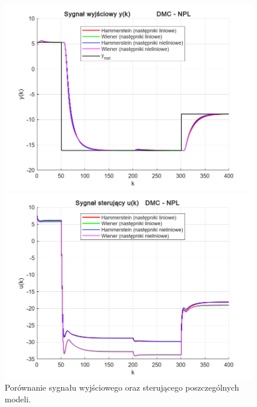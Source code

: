 \documentclass[a4paper,titlepage,11pt,floatssmall]{mwrep}
\begin{document}
\begin{figure}[p]
\centering
\begin{minipage}{0.495\linewidth}
    \centering
    \includegraphics[width=1.1\linewidth]{pictures/DMC_npl_y}
\end{minipage}
\hfill
\begin{minipage}{0.495\linewidth}
    \centering
    \includegraphics[width=1.1\linewidth]{pictures/DMC_npl_u}
\end{minipage}

\caption{Porównanie sygnału wyjściowego oraz sterującego poszczególnych modeli.}

\vspace{2cm} 


\end{figure}
\end{document}
